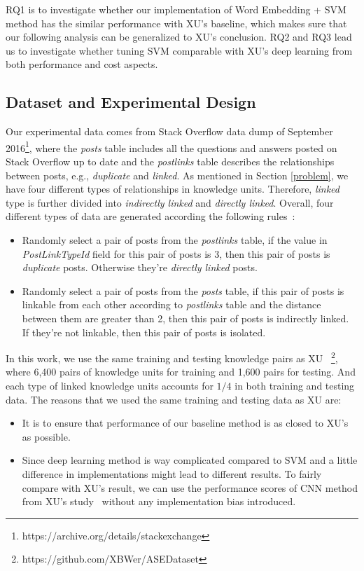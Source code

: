\documentclass[sigconf,review, anonymous]{acmart}
\theoremstyle{break}
\newcommand{\bi}{\begin{itemize}[leftmargin=0.4cm]}
\newcommand{\ei}{\end{itemize}}
\begin{document}
 RQ1 is to investigate whether our implementation of Word Embedding + SVM method has
 the similar performance with XU's baseline, which makes sure that our following 
 analysis can be generalized to XU's conclusion. RQ2 and RQ3 lead us to
 investigate whether tuning SVM comparable with XU's deep learning from both 
 performance and cost aspects.
 


\subsection{Dataset and Experimental Design}
Our experimental data comes from Stack Overflow data dump of 
September 2016\footnote{https://archive.org/details/stackexchange},
where the {\it posts} table includes all the questions and answers posted on Stack Overflow
up to date and the {\it postlinks} table describes the relationships between posts, 
e.g., {\it duplicate} and {\it linked}. As mentioned in Section
\ref{problem}, we have four different types of relationships in knowledge units.
Therefore,  {\it linked} type is further divided into {\it indirectly linked} and {\it directly linked}.
Overall, four different types of data are generated according the following rules~\cite{xu2016predicting}:
\bi
\item Randomly select a pair of posts from the {\it postlinks} table, if the value
in  {\it PostLinkTypeId} field for this pair of posts is $3$, then this pair of posts is {\it duplicate} posts. 
Otherwise they're {\it directly linked} posts.

\item Randomly select a pair of posts from the {\it posts} table, if this pair of posts is linkable from each other according to
{\it postlinks} table and the distance between them are greater than 2, then this pair of posts is indirectly linked. If they're
not linkable, then this pair of posts is {isolated}.
\ei

In this work, we use the same training and testing
knowledge pairs as XU ~\cite{xu2016predicting}\footnote{https://github.com/XBWer/ASEDataset}, 
where 6,400 pairs of  knowledge units for training and 1,600 pairs for testing. And each type 
of linked knowledge units accounts for $1/4$ in both training and testing data. The reasons that
we used the same training and testing data as XU are:
\bi
\item It is to ensure that  performance of our baseline method is as closed to XU's as possible.
\item Since deep learning method is way complicated compared to SVM and a little difference in implementations
might lead to different results. To fairly compare with XU's result, we can use the  performance scores
of CNN method from XU's study~\cite{xu2016predicting} without any implementation bias introduced.
\ei
\end{document}
